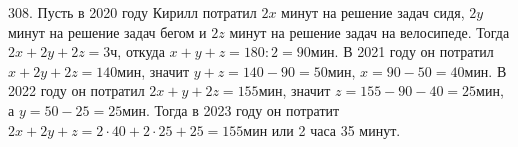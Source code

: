 308. Пусть в 2020 году Кирилл потратил $2x$ минут на решение задач сидя, $2y$ минут на решение задач бегом и $2z$ минут на решение задач на велосипеде. Тогда
$2x+2y+2z=3$ч, откуда $x+y+z=180:2=90$мин. В 2021 году он потратил $x+2y+2z=140$мин, значит $y+z=140-90=50$мин, $x=90-50=40$мин. В 2022 году он потратил $2x+y+2z=155$мин, значит $z=155-90-40=25$мин, а $y=50-25=25$мин. Тогда в 2023 году он потратит $2x+2y+z=2\cdot40+2\cdot25+25=155$мин или 2 часа 35 минут.\\

